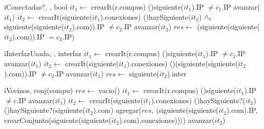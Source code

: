 \begin{Algoritmos}
\begin{algoritmo}{iConectar}{, , , , }{}
    siguiente($it_{3$).com $\gets$ $it_{2}$\com*{$\Theta(1)$}
    siguiente($it_{4}$).com $\gets$ $it_{1}$\com*{$\Theta(1)$}
  \end{algoritmo}
  
  \begin{algoritmo}{iConectadas?}{, , }{bool}{}
     $it_{1} \gets$ crearIt(r.compus)
    \While(){siguiente($it_{1}$).IP $\neq c_{1}$.IP}{
      avanzar($it_{1}$)
    }
     $it_{2} \gets$ crearIt(siguiente($it_{1}$).conexiones)
    \While(){haySiguiente($it_{2}$) $\land_{\mathrm{\scriptscriptstyle{L}}}$ siguiente(siguiente($it_{2}$).com)).IP $\neq c_{2}$.IP}{
      avanzar($it_{2}$)
    }
    $res \gets$ (siguiente(siguiente($it_{2}$).com)).IP $= c_{2}$.IP)
  \end{algoritmo}  

  \begin{algoritmo}{iInterfazUsada}{, , }{interfaz}{}
     $it_{1} \gets$ crearIt(r.compus)  
    \While(){siguiente($it_{1}$).IP $\neq c_{1}$.IP}{
      avanzar($it_{1}$)
    }
     $it_{2} \gets$ crearIt(siguiente($it_{1}$).conexiones)
    \While(){(siguiente(siguiente($it_{2}$).com)).IP $\neq c_{2}$.IP}{
      avanzar($it_{1}$)
    }
    $res \gets$ siguiente($it_{2}$).inter
  \end{algoritmo}  
    
  \begin{algoritmo}{iVecinos}{, }{conj(compu)}{}
    $res \gets$ vacio() 
     $it_{1} \gets$ crearIt(r.compus)
    \While(){siguiente($it_{1}$).IP $\neq c$.IP}{
      avanzar($it_{1}$)
    }
     $it_{2} \gets$ crearIt(siguiente($it_{1}$).conexiones)
    \While(){haySiguiente?($it_{2}$)}{
      \If(){haySiguiente?(siguiente($it_{2}$).com)}{
        agregar($res$, $\langle$siguiente(siguiente($it_{2}$).com).IP, crearConjunto(siguiente(siguiente($it_{2}$).com).conexiones))$\rangle$)
      }
      avanzar($it_{2}$)
    }
  \end{algoritmo}
  

\end{Algoritmos}
